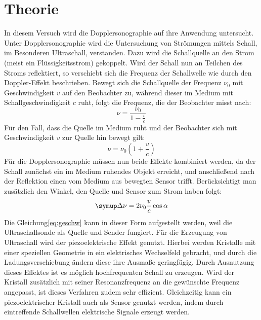 \section{Theorie}
\label{sec:Theorie}
In diesem Versuch wird die Dopplersonographie auf ihre Anwendung untersucht.
Unter Dopplersonographie wird die Untersuchung von Strömungen mittels Schall, im Besonderen Ultraschall, verstanden.
Dazu wird die Schallquelle an den Strom (meist ein Flüssigkeitsstrom) gekoppelt.
Wird der Schall nun an Teilchen des Stroms reflektiert, so verschiebt sich die Frequenz der Schallwelle wie durch den
Doppler-Effekt beschrieben.
Bewegt sich die Schallquelle der Frequenz $\nu_0$ mit Geschwindigkeit $v$ auf den Beobachter zu,
während dieser im Medium mit Schallgeschwindigkeit $c$ ruht, folgt die Frequenz, die der Beobachter misst nach:
\begin{equation}
	\nu = \frac{\nu_0}{1 - \frac{v}{c}}
\end{equation}
Für den Fall, dass die Quelle im Medium ruht und der Beobachter sich mit Geschwindigkeit $v$ zur Quelle hin bewegt gilt:
\begin{equation}
	\nu = \nu_0\left(1+\frac{v}{c}\right)
\end{equation}
Für die Dopplersonographie müssen nun beide Effekte kombiniert werden, da der Schall zunächst ein im Medium ruhendes Objekt erreicht,
und anschließend nach der Reflektion einen vom Medium aus bewegten Sensor trifft.
Berücksichtigt man zusätzlich den Winkel, den Quelle und Sensor zum Strom haben folgt:
\begin{equation}
	\label{eq:geschw}
	\symup\Delta\nu = 2\nu_0\frac{v}{c}\cos \alpha
\end{equation}
Die Gleichung\eqref{eq:geschw} kann in dieser Form aufgestellt werden, weil die Ultraschallsonde als Quelle und Sender fungiert.
Für die Erzeugung von Ultraschall wird der piezoelektrische Effekt genutzt.
Hierbei werden Kristalle mit einer speziellen Geometrie in ein elektrisches Wechselfeld gebracht,
und durch die Ladungsverschiebung ändern diese ihre Ausmaße geringfügig.
Durch Ausnutzung dieses Effektes ist es möglich hochfrequenten Schall zu erzeugen.
Wird der Kristall zusätzlich mit seiner Resonanzfrequenz an die gewünschte Frequenz angepasst,
ist dieses Verfahren zudem sehr effizient.
Gleichzeitig kann ein piezoelektrischer Kristall auch als Sensor genutzt werden, indem durch eintreffende Schallwellen
elektrische Signale erzeugt werden.
